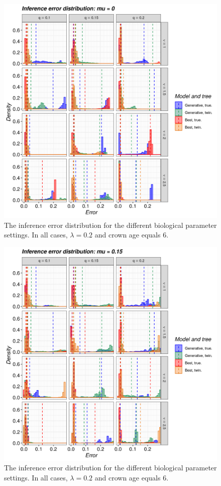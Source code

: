 \begin{figure}[!htbp]
  \includegraphics[width=\textwidth]{20190829_figure_1a.png}
  \caption{
    The inference error distribution 
    for the different biological
    parameter settings. In all cases, $\lambda = 0.2$ and 
    crown age equals 6. 
  }
  \label{fig:errors_yule}
\end{figure}

\begin{figure}[!htbp]
  \includegraphics[width=\textwidth]{20190829_figure_1b.png}
  \caption{
    The inference error distribution 
    for the different biological
    parameter settings. In all cases, $\lambda = 0.2$ and 
    crown age equals 6. 
  }
  \label{fig:errors_bd}
\end{figure}